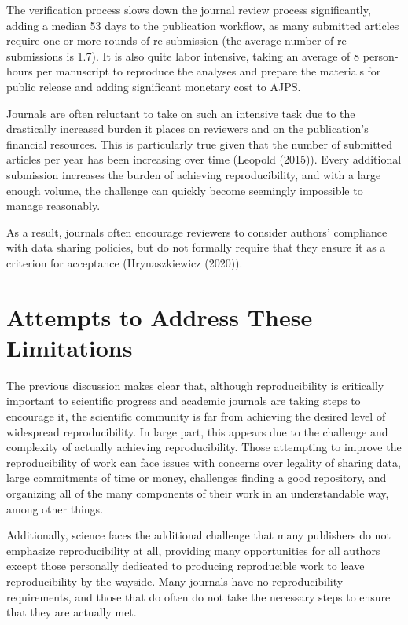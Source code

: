 \documentclass[12pt,twoside]{reedthesis}
\begin{document}
The verification process slows down the journal review process significantly, adding a median 53 days to the publication workflow, as many submitted articles require one or more rounds of re-submission (the average number of re-submissions is 1.7). It is also quite labor intensive, taking an average of 8 person-hours per manuscript to reproduce the analyses and prepare the materials for public release and adding significant monetary cost to AJPS.

Journals are often reluctant to take on such an intensive task due to the drastically increased burden it places on reviewers and on the publication's financial resources. This is particularly true given that the number of submitted articles per year has been increasing over time (Leopold (2015)). Every additional submission increases the burden of achieving reproducibility, and with a large enough volume, the challenge can quickly become seemingly impossible to manage reasonably.

As a result, journals often encourage reviewers to consider authors' compliance with data sharing policies, but do not formally require that they ensure it as a criterion for acceptance (Hrynaszkiewicz (2020)).

\hypertarget{attempts-to-address-these-limitations}{%
\section{Attempts to Address These Limitations}\label{attempts-to-address-these-limitations}}

The previous discussion makes clear that, although reproducibility is critically important to scientific progress and academic journals are taking steps to encourage it, the scientific community is far from achieving the desired level of widespread reproducibility. In large part, this appears due to the challenge and complexity of actually achieving reproducibility. Those attempting to improve the reproducibility of work can face issues with concerns over legality of sharing data, large commitments of time or money, challenges finding a good repository, and organizing all of the many components of their work in an understandable way, among other things.

Additionally, science faces the additional challenge that many publishers do not emphasize reproducibility at all, providing many opportunities for all authors except those personally dedicated to producing reproducible work to leave reproducibility by the wayside. Many journals have no reproducibility requirements, and those that do often do not take the necessary steps to ensure that they are actually met.
\end{document}
